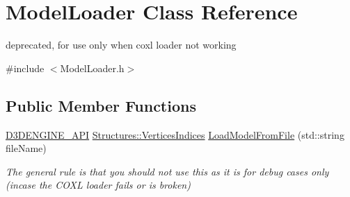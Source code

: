 \hypertarget{class_model_loader}{}\section{Model\+Loader Class Reference}
\label{class_model_loader}


deprecated, for use only when coxl loader not working  




{\ttfamily \#include $<$Model\+Loader.\+h$>$}

\subsection*{Public Member Functions}
\begin{DoxyCompactItemize}
\item 
\mbox{\hyperlink{stdafx_8h_a8ee2d990c5dfba7794dd2b60741d7722}{D3\+D\+E\+N\+G\+I\+N\+E\+\_\+\+A\+PI}} \mbox{\hyperlink{struct_structures_1_1_vertices_indices}{Structures\+::\+Vertices\+Indices}} \mbox{\hyperlink{class_model_loader_aa70efbdc2fff6bf8208fcc76cfd4a464}{Load\+Model\+From\+File}} (std\+::string file\+Name)
\begin{DoxyCompactList}\small\item\em The general rule is that you should not use this as it is for debug cases only (incase the C\+O\+XL loader fails or is broken) \end{DoxyCompactList}\end{DoxyCompactItemize}
